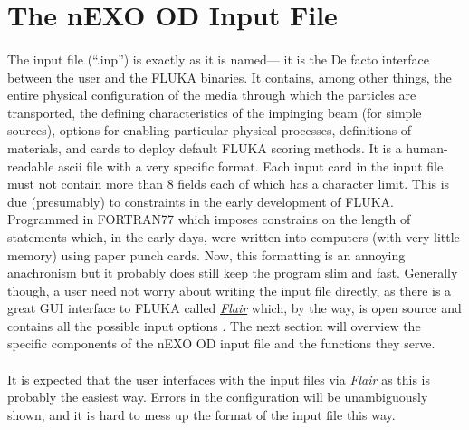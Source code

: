\section{The nEXO OD Input File}
\paragraph{}
The input file (``.inp'') is exactly as it is named— it is the De facto interface between the user and the FLUKA binaries. It contains, among other things, the entire physical configuration of the media through which the particles are transported, the defining characteristics of the impinging beam (for simple sources), options for enabling particular physical processes, definitions of materials, and cards to deploy default FLUKA scoring methods. It is a human-readable ascii file with a very specific format. Each input card in the input file must not contain more than 8 fields each of which has a character limit. This is due (presumably) to constraints in the early development of FLUKA. Programmed in FORTRAN77 which imposes constrains on the length of statements which, in the early days, were written into computers (with very little memory) using paper punch cards. Now, this formatting is an annoying anachronism but it probably does still keep the program slim and fast. Generally though, a user need not worry about writing the input file directly, as there is a great GUI interface to FLUKA called \href{https://fluka.cern/documentation/examples/flair}{\textit{Flair}} which, by the way, is open source and contains all the possible input options \cite{Flair}. The next section will overview the specific components of the nEXO OD input file and the functions they serve. 

\paragraph{}
It is expected that the user interfaces with the input files via \href{https://fluka.cern/documentation/examples/flair}{\textit{Flair}} as this is probably the easiest way. Errors in the configuration will be unambiguously shown, and it is hard to mess up the format of the input file this way.